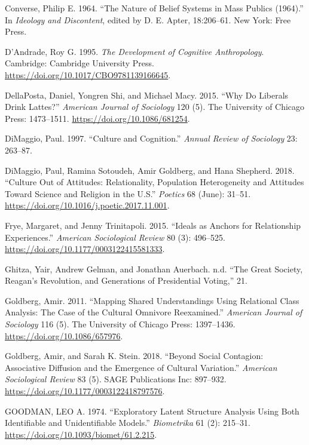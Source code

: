 \documentclass[12pt,]{article}
\begin{document}
\leavevmode\hypertarget{ref-converse1964}{}%
Converse, Philip E. 1964. ``The Nature of Belief Systems in Mass Publics (1964).'' In \emph{Ideology and Discontent}, edited by D. E. Apter, 18:206--61. New York: Free Press.

\leavevmode\hypertarget{ref-dandrade1995}{}%
D'Andrade, Roy G. 1995. \emph{The Development of Cognitive Anthropology}. Cambridge: Cambridge University Press. \url{https://doi.org/10.1017/CBO9781139166645}.

\leavevmode\hypertarget{ref-dellaposta2015}{}%
DellaPosta, Daniel, Yongren Shi, and Michael Macy. 2015. ``Why Do Liberals Drink Lattes?'' \emph{American Journal of Sociology} 120 (5). The University of Chicago Press: 1473--1511. \url{https://doi.org/10.1086/681254}.

\leavevmode\hypertarget{ref-dimaggio1997}{}%
DiMaggio, Paul. 1997. ``Culture and Cognition.'' \emph{Annual Review of Sociology} 23: 263--87.

\leavevmode\hypertarget{ref-dimaggio2018a}{}%
DiMaggio, Paul, Ramina Sotoudeh, Amir Goldberg, and Hana Shepherd. 2018. ``Culture Out of Attitudes: Relationality, Population Heterogeneity and Attitudes Toward Science and Religion in the U.S.'' \emph{Poetics} 68 (June): 31--51. \url{https://doi.org/10.1016/j.poetic.2017.11.001}.

\leavevmode\hypertarget{ref-frye2015}{}%
Frye, Margaret, and Jenny Trinitapoli. 2015. ``Ideals as Anchors for Relationship Experiences.'' \emph{American Sociological Review} 80 (3): 496--525. \url{https://doi.org/10.1177/0003122415581333}.

\leavevmode\hypertarget{ref-ghitza}{}%
Ghitza, Yair, Andrew Gelman, and Jonathan Auerbach. n.d. ``The Great Society, Reagan's Revolution, and Generations of Presidential Voting,'' 21.

\leavevmode\hypertarget{ref-goldberg2011}{}%
Goldberg, Amir. 2011. ``Mapping Shared Understandings Using Relational Class Analysis: The Case of the Cultural Omnivore Reexamined.'' \emph{American Journal of Sociology} 116 (5). The University of Chicago Press: 1397--1436. \url{https://doi.org/10.1086/657976}.

\leavevmode\hypertarget{ref-goldberg2018}{}%
Goldberg, Amir, and Sarah K. Stein. 2018. ``Beyond Social Contagion: Associative Diffusion and the Emergence of Cultural Variation.'' \emph{American Sociological Review} 83 (5). SAGE Publications Inc: 897--932. \url{https://doi.org/10.1177/0003122418797576}.

\leavevmode\hypertarget{ref-goodman1974}{}%
GOODMAN, LEO A. 1974. ``Exploratory Latent Structure Analysis Using Both Identifiable and Unidentifiable Models.'' \emph{Biometrika} 61 (2): 215--31. \url{https://doi.org/10.1093/biomet/61.2.215}.
\end{document}

